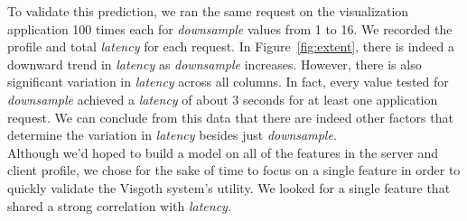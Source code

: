 To validate this prediction, we ran the same request on the visualization
application 100 times each for \emph{downsample} values from 1 to 16. We
recorded the profile and total \emph{latency} for each request. In
Figure~\ref{fig:extent}, there is indeed a downward trend in \emph{latency} as
\emph{downsample} increases. However, there is also significant variation in
\emph{latency} across all columns. In fact, every value tested for
\emph{downsample} achieved a \emph{latency} of about 3 seconds for at least one
application request. We can conclude from this data that there are indeed other
factors that determine the variation in \emph{latency} besides just
\emph{downsample}.\\

Although we'd hoped to build a model on all of the features in the server and
client profile, we chose for the sake of time to focus on a single feature in
order to quickly validate the Visgoth system's utility. We looked for a single
feature that shared a strong correlation with \emph{latency}.\\

